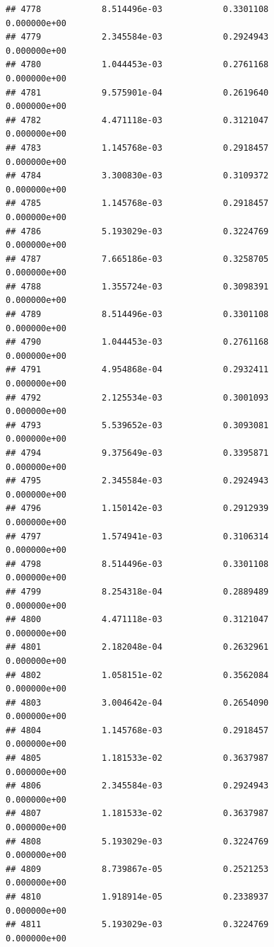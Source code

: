 \documentclass[
]{article}
\begin{document}
\begin{verbatim}
## 4778            8.514496e-03            0.3301108            0.000000e+00
## 4779            2.345584e-03            0.2924943            0.000000e+00
## 4780            1.044453e-03            0.2761168            0.000000e+00
## 4781            9.575901e-04            0.2619640            0.000000e+00
## 4782            4.471118e-03            0.3121047            0.000000e+00
## 4783            1.145768e-03            0.2918457            0.000000e+00
## 4784            3.300830e-03            0.3109372            0.000000e+00
## 4785            1.145768e-03            0.2918457            0.000000e+00
## 4786            5.193029e-03            0.3224769            0.000000e+00
## 4787            7.665186e-03            0.3258705            0.000000e+00
## 4788            1.355724e-03            0.3098391            0.000000e+00
## 4789            8.514496e-03            0.3301108            0.000000e+00
## 4790            1.044453e-03            0.2761168            0.000000e+00
## 4791            4.954868e-04            0.2932411            0.000000e+00
## 4792            2.125534e-03            0.3001093            0.000000e+00
## 4793            5.539652e-03            0.3093081            0.000000e+00
## 4794            9.375649e-03            0.3395871            0.000000e+00
## 4795            2.345584e-03            0.2924943            0.000000e+00
## 4796            1.150142e-03            0.2912939            0.000000e+00
## 4797            1.574941e-03            0.3106314            0.000000e+00
## 4798            8.514496e-03            0.3301108            0.000000e+00
## 4799            8.254318e-04            0.2889489            0.000000e+00
## 4800            4.471118e-03            0.3121047            0.000000e+00
## 4801            2.182048e-04            0.2632961            0.000000e+00
## 4802            1.058151e-02            0.3562084            0.000000e+00
## 4803            3.004642e-04            0.2654090            0.000000e+00
## 4804            1.145768e-03            0.2918457            0.000000e+00
## 4805            1.181533e-02            0.3637987            0.000000e+00
## 4806            2.345584e-03            0.2924943            0.000000e+00
## 4807            1.181533e-02            0.3637987            0.000000e+00
## 4808            5.193029e-03            0.3224769            0.000000e+00
## 4809            8.739867e-05            0.2521253            0.000000e+00
## 4810            1.918914e-05            0.2338937            0.000000e+00
## 4811            5.193029e-03            0.3224769            0.000000e+00

\end{verbatim}
\end{document}
